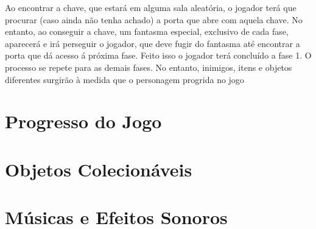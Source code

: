 \documentclass[12pt]{article}
\begin{document}
    Ao encontrar a chave, que estará em alguma sala aleatória, o jogador terá que procurar (caso ainda não tenha achado) a porta que abre com aquela chave. No entanto, ao conseguir a chave, um fantasma especial, exclusivo de cada fase, aparecerá e irá perseguir o jogador, que deve fugir do fantasma até encontrar a porta que dá acesso á próxima fase. Feito isso o jogador terá concluído a fase 1. O processo se repete para as demais fases. No entanto, inimigos, itens e objetos diferentes surgirão à medida que o personagem progrida no jogo

\section{Progresso do Jogo}
\section{Objetos Colecionáveis}
\section{Músicas e Efeitos Sonoros}
\end{document}
